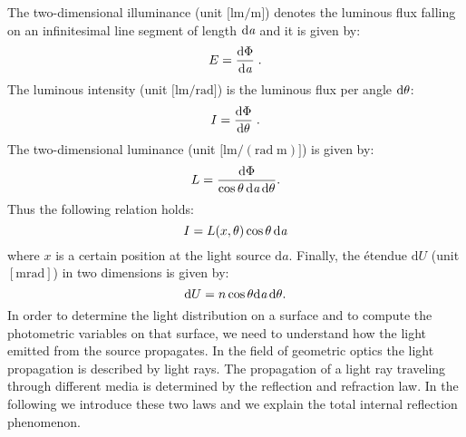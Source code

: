  The two-dimensional illuminance \big(unit $\big[\textrm{lm}/\textrm{m}\big]$\big) denotes the luminous flux falling on an infinitesimal line segment of length $\textrm{d}\textit{a}$ 
and it is given by:
 \begin{equation}
 E=\frac{\textrm{d}\Phi}{\textrm{d}\textit{a}}\;.
 \end{equation}
 The luminous intensity \big(unit $\big[\textrm{lm}/\textrm{rad}\big]$\big) is the luminous flux per angle $\textrm{d}\mbox{$\theta$}$:
 \begin{equation}
 I=\frac{\textrm{d}\Phi}{\textrm{d}\mbox{$\theta$}}\;.
 \end{equation}
 The two-dimensional luminance \big(unit $\big[\textrm{lm}/(\textrm{rad}\; \textrm{m})\big]$\big) is given by:
 \begin{equation}
 L= \frac{\textrm {d}\Phi}{\cos\mbox{$\theta$}\,\textrm{d}\textit{a} \,\textrm{d}\mbox{$\theta$}}.
 \end{equation}
 Thus the following relation holds:
 \begin{equation}
 I = L(x, \mbox{$\theta$})\cos\mbox{$\theta$}\,\textrm{d}\textit{a}
 \end{equation}
where $x$ is a certain position at the light source $\textrm{d}a$.
 Finally, the \'{e}tendue $\textrm{d}U $ (unit $[\textrm{m}\textrm{rad}]$) in two dimensions is given by:
\begin{equation}\label{etendue2d}
\textrm{d}U = n\cos\mbox{$\theta$}\textrm{d}\textit{a}\,\textrm{d}\mbox{$\theta$}.
\end{equation}
In order to determine the light distribution on a surface and to compute the photometric variables on that surface, we need to understand how the light emitted from the source propagates. In the field of geometric optics the light propagation is described by light rays.
The propagation of a light ray traveling through  different media is determined by the reflection and refraction law.
In the following we introduce these two laws and we explain the total internal reflection phenomenon.

